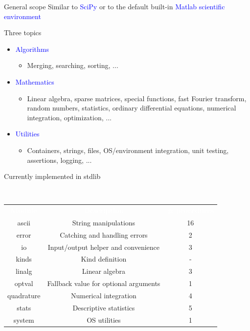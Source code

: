 \documentclass{beamer}
\begin{document}
\begin{frame}[t]{General scope}
	Similar to \textcolor{blue}{SciPy} or
	to the default built-in \textcolor{blue}{Matlab scientific environment}

        \textcolor{mygreen}{Three} topics
	\begin{itemize}
		\item \textcolor{blue}{Algorithms}
		\begin{itemize}
			\item Merging, searching, sorting, ...
		\end{itemize}
		\item \textcolor{blue}{Mathematics}
		\begin{itemize}
			\item Linear algebra, sparse matrices, special functions, fast Fourier transform, random numbers, statistics, ordinary differential equations, numerical integration, optimization, ...
		\end{itemize}
		\item \textcolor{blue}{Utilities}
		\begin{itemize}
			\item Containers, strings, files, OS/environment integration, unit testing, assertions, logging, ...
		\end{itemize}
	\end{itemize}
\end{frame}


\begin{frame}[c]{Currently implemented in stdlib}
	\begin{block}{~\vspace{0.5cm}}
	\vspace{-0.8cm}
	\begin{tabular}{ccc}
		\textcolor{white}{\bf Module} &\textcolor{white}{\bf Description} &\textcolor{white}{\bf \# procedures} \\
		ascii & String manipulations & 16\\
		error & Catching and handling errors & 2\\
		io & Input/output helper and convenience & 3\\
		kinds & Kind definition & -\\
		linalg & Linear algebra & 3\\
		optval & Fallback value for optional arguments & 1\\
		quadrature & Numerical integration & 4\\
		stats & Descriptive statistics & 5\\
		system & OS utilities & 1 \\
	\end{tabular}
	\end{block}
\end{frame}
\end{document}

